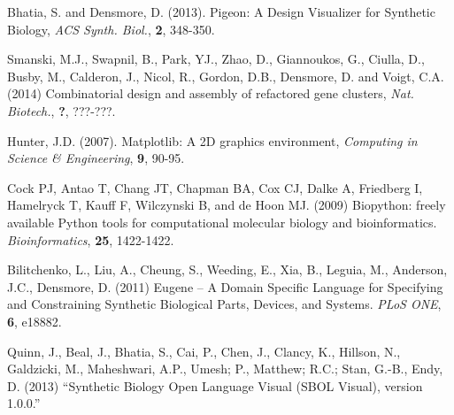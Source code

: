 \documentclass{bioinfo}
\begin{document}
\begin{thebibliography}{}
	
 Bhatia, S. and Densmore, D. (2013). Pigeon: A Design Visualizer for Synthetic Biology, {\it ACS Synth. Biol.}, {\bf 2}, 348-350.

 Smanski, M.J., Swapnil, B., Park, YJ., Zhao, D., Giannoukos, G., Ciulla, D., Busby, M., Calderon, J., Nicol, R., Gordon, D.B., Densmore, D. and Voigt, C.A. (2014) Combinatorial design and assembly of refactored gene clusters, {\it Nat. Biotech.}, {\bf ?}, ???-???.

 Hunter, J.D. (2007). Matplotlib: A 2D graphics environment, {\it Computing in Science \& Engineering}, {\bf 9}, 90-95.

Cock PJ, Antao T, Chang JT, Chapman BA, Cox CJ, Dalke A, Friedberg I, Hamelryck T, Kauff F, Wilczynski B, and de Hoon MJ. (2009) Biopython: freely available Python tools for computational molecular biology and bioinformatics. {\it Bioinformatics}, {\bf 25}, 1422-1422.

Bilitchenko, L., Liu, A., Cheung, S., Weeding, E., Xia, B., Leguia, M., Anderson, J.C., Densmore, D. (2011) Eugene – A Domain Specific Language for Specifying and Constraining Synthetic Biological Parts, Devices, and Systems. {\it PLoS ONE}, {\bf 6}, e18882.

Quinn, J., Beal, J., Bhatia, S., Cai, P., Chen, J., Clancy, K., Hillson, N., Galdzicki, M., Maheshwari, A.P., Umesh; P., Matthew; R.C.; Stan, G.-B., Endy, D. (2013) ``Synthetic Biology Open Language Visual (SBOL Visual), version 1.0.0.''

\end{thebibliography}
\end{document}
